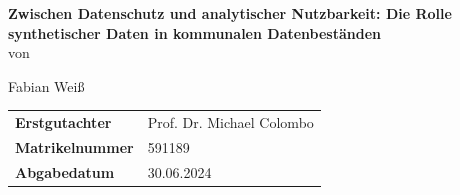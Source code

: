\begin{center}
\begin{center}
\large{\textbf{Zwischen Datenschutz und analytischer Nutzbarkeit: Die Rolle synthetischer Daten in kommunalen Datenbeständen}} \\
\vspace{2em}
\small{von}
\end{center}

\begin{center}
\large{Fabian Weiß}
\end{center}

\vspace{8em}

\begin{flushleft}
\begin{tabular}{ll}
\textbf{Erstgutachter} & Prof. Dr. Michael Colombo\\
\textbf{Matrikelnummer} & 591189\\
\textbf{Abgabedatum} & 30.06.2024\\
\end{tabular}
\end{flushleft}

\end{center}